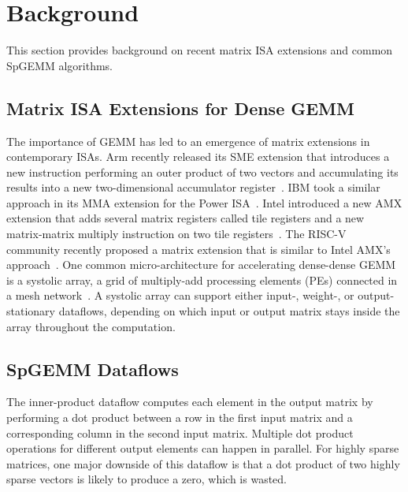 \section{Background}
\label{sec-spz-background}

This section provides background on recent matrix ISA extensions and common
SpGEMM algorithms.

\subsection{Matrix ISA Extensions for Dense GEMM}

The importance of GEMM has led to an emergence of matrix extensions in
contemporary ISAs.
Arm recently released its SME extension that introduces a new instruction
performing an outer product of two vectors and accumulating its results into a
new two-dimensional accumulator register~\cite{arm-sme-web}.
IBM took a similar approach in its MMA extension for the Power
ISA~\cite{ibm-mmx-assist-web}.
Intel introduced a new AMX extension that adds several matrix registers called
tile registers and a new matrix-matrix multiply instruction on two tile
registers~\cite{intel-amx-web,nassif-intel-sapphire-isscc2022}.
The RISC-V community recently proposed a matrix extension that is similar to
Intel AMX's approach~\cite{riscv-mtx-ext-proposal-web}.
One common micro-architecture for accelerating dense-dense GEMM is a systolic
array, a grid of multiply-add processing elements (PEs) connected in a mesh
network~\cite{jouppi-datacenter-isca2017,jeong-rasa-dac2021,nassif-intel-sapphire-isscc2022}.
A systolic array can support either input-, weight-, or output-stationary
dataflows, depending on which input or output matrix stays inside the array
throughout the computation.

\subsection{SpGEMM Dataflows}

The inner-product dataflow computes each element in the output matrix by
performing a dot product between a row in the first input matrix and a
corresponding column in the second input matrix.
Multiple dot product operations for different output elements can happen in
parallel.
For highly sparse matrices, one major downside of this dataflow is that a dot
product of two highly sparse vectors is likely to produce a zero, which is
wasted.

